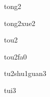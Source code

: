 \begin{multicols*}{2}
\begin{verbete}[同]{tong2}
\end{verbete}

\begin{verbete}[同学]{tong2xue2}
\end{verbete}

\begin{verbete}[头]{tou2}
\end{verbete}

\begin{verbete}[头发]{tou2fa0}
\end{verbete}

\begin{verbete}[图书馆]{tu2shu1guan3}
\end{verbete}

\begin{verbete}[腿]{tui3}
\end{verbete}

\end{multicols*}
